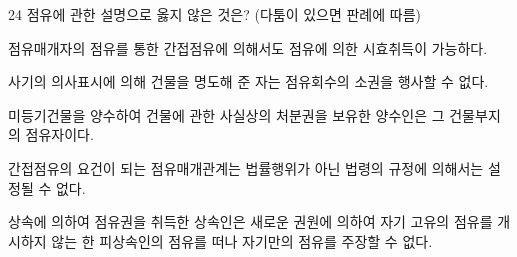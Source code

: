 \begin{question}{24}
점유에 관한 설명으로 옳지 않은 것은? (다툼이 있으면 판례에 따름)
\begin{choices}
  \item 점유매개자의 점유를 통한 간접점유에 의해서도 점유에 의한 시효취득이 가능하다.
  \item 사기의 의사표시에 의해 건물을 명도해 준 자는 점유회수의 소권을 행사할 수 없다.
  \item 미등기건물을 양수하여 건물에 관한 사실상의 처분권을 보유한 양수인은 그 건물부지의 점유자이다.
  \item 간접점유의 요건이 되는 점유매개관계는 법률행위가 아닌 법령의 규정에 의해서는 설정될 수 없다.
  \item 상속에 의하여 점유권을 취득한 상속인은 새로운 권원에 의하여 자기 고유의 점유를 개시하지 않는 한 피상속인의 점유를 떠나 자기만의 점유를 주장할 수 없다.
\end{choices}
\end{question}
